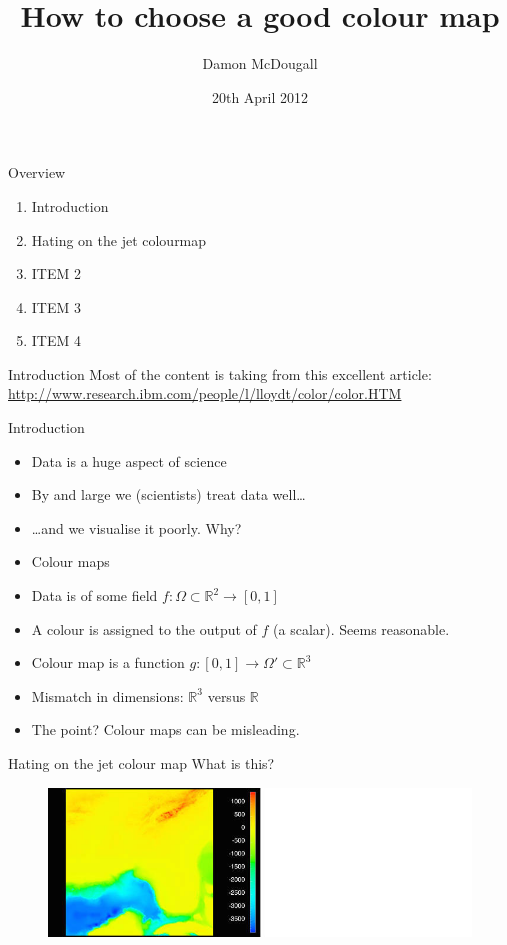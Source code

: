 \documentclass[10pt,presentation,compress]{beamer}
\title{How to choose a good colour map}
\author{Damon McDougall}
\institute{Institute for Computational and Engineering Sciences, UT Austin, USA}
\date{20th April 2012}
\begin{document}
\begin{frame}
  \titlepage
\end{frame}

\begin{frame}{Overview}
  \begin{enumerate}
    \item Introduction
    \item Hating on the jet colourmap
    \item ITEM 2
    \item ITEM 3
    \item ITEM 4
  \end{enumerate}
\end{frame}

\begin{frame}{Introduction}
  Most of the content is taking from this excellent article:
  \linebreak
  \linebreak
  \textcolor{blue}{\small{\url{http://www.research.ibm.com/people/l/lloydt/color/color.HTM}}}
\end{frame}

\begin{frame}{Introduction}
  \begin{itemize}
    \item Data is a huge aspect of science
    \item By and large we (scientists) treat data well\dots
    \item \dots and we visualise it poorly.  Why?
    \item Colour maps
    \item Data is of some field
      $f : \Omega \subset \mathbb{R}^2 \to [0, 1]$
    \item A colour is assigned to the output of $f$ (a scalar).  Seems
      reasonable.
    \item Colour map is a function
      $g : [0, 1] \to \Omega' \subset \mathbb{R}^3$
    \item Mismatch in dimensions:  $\mathbb{R}^3$ versus $\mathbb{R}$
    \item The point?  Colour maps can be misleading.
  \end{itemize}
\end{frame}

\begin{frame}{Hating on the jet colour map}
  What is this?
  \begin{figure}[htp]
    \includegraphics[scale=7.0]{florida_masked.jpg}
  \end{figure}
\end{frame}
\end{document}

